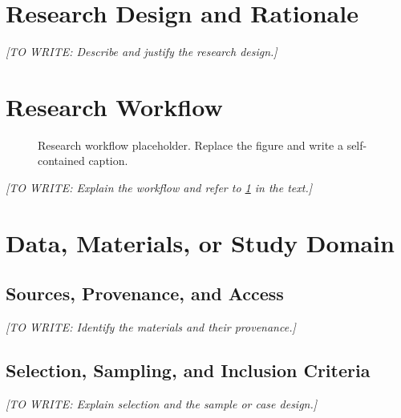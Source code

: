 \documentclass[12pt,a4paper,oneside]{report}
\newif\ifshowguidance
\newcommand{\Guide}[1]{%
  \ifshowguidance
  \begin{tcolorbox}[enhanced,breakable,colback=GuideBlue,
    colframe=GuideBorder,boxrule=0.5pt,arc=1mm,
    title={Writing guide --- replace with your research},
    colbacktitle=ThesisBlue,coltitle=white,fonttitle=\small\bfseries,
    before skip=10pt,after skip=10pt]
    \small #1
  \end{tcolorbox}
  \fi}
\newcommand{\Draft}[1]{\par\noindent\textit{[TO WRITE: #1]}\par}
\begin{document}
\section{Research Design and Rationale}
\Guide{Identify whether the study is experimental, observational,
computational, theoretical, qualitative, mixed-methods, or design-oriented.
Explain why this design fits the question and which alternatives were
considered. Specify units of analysis and the conditions of comparison.}
\Draft{Describe and justify the research design.}

\section{Research Workflow}
\Guide{Describe the ordered stages from input collection to final analysis.
Identify decisions, dependencies, outputs, and quality checks. Include a
diagram when it adds clarity. The figure below requires no external file;
replace its framed placeholder with your own graphic.}
\begin{figure}[htbp]
\centering
{}
\caption[Research workflow placeholder]{Research workflow placeholder.
Replace the figure and write a self-contained caption.}
\label{fig:workflow}
\end{figure}
\Draft{Explain the workflow and refer to \cref{fig:workflow} in the text.}

\section{Data, Materials, or Study Domain}
\subsection{Sources, Provenance, and Access}
\Guide{Describe datasets, specimens, documents, geometries, participants,
equipment, or simulation inputs. Give provenance, collection dates,
versions, permissions, licensing, and access conditions as applicable.
Distinguish observed, synthetic, simulated, and externally supplied data.}
\Draft{Identify the materials and their provenance.}
\subsection{Selection, Sampling, and Inclusion Criteria}
\Guide{Define the target population or parameter space, sampling method,
sample size rationale, exclusions, and actual retained sample. Explain
representativeness and potential selection bias. For simulations, define
case selection and parameter coverage.}
\Draft{Explain selection and the sample or case design.}
\end{document}
